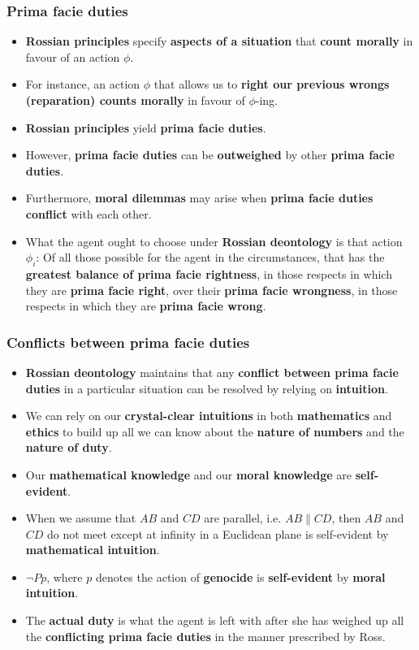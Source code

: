 \documentclass[11pt]{article}
\begin{document}
\subsubsection{Prima facie duties}
\label{sec:org7e4c5fe}
\begin{itemize}
\item \textbf{Rossian principles} specify \textbf{aspects of a situation} that \textbf{count morally} in favour of an action \(\phi\).
\item For instance, an action \(\phi\) that allows us to \textbf{right our previous wrongs (reparation) counts morally} in favour of \(\phi\)-ing.
\item \textbf{Rossian principles} yield \textbf{prima facie duties}.
\item However, \textbf{prima facie duties} can be \textbf{outweighed} by other \textbf{prima facie duties}.
\item Furthermore, \textbf{moral dilemmas} may arise when \textbf{prima facie duties conflict} with each other.
\item What the agent ought to choose under \textbf{Rossian deontology} is that action \(\phi_i\):
Of all those possible for the agent in the circumstances, that has the \textbf{greatest balance of prima facie rightness}, in those respects in which they are \textbf{prima facie right}, over their \textbf{prima facie wrongness}, in those respects in which they are \textbf{prima facie wrong}.
\end{itemize}
\subsubsection{Conflicts between prima facie duties}
\label{sec:orga7a9f00}
\begin{itemize}
\item \textbf{Rossian deontology} maintains that any \textbf{conflict between prima facie duties} in a particular situation can be resolved by relying on \textbf{intuition}.
\item We can rely on our \textbf{crystal-clear intuitions} in both \textbf{mathematics} and \textbf{ethics} to build up all we can know about the \textbf{nature of numbers} and the \textbf{nature of duty}.
\item Our \textbf{mathematical knowledge} and our \textbf{moral knowledge} are \textbf{self-evident}.
\item When we assume that \(AB\) and \(CD\) are parallel, i.e. \(AB \parallel CD\), then \(AB\) and \(CD\) do not meet except at infinity in a Euclidean plane is self-evident by \textbf{mathematical intuition}.
\item \(\neg Pp\), where \(p\) denotes the action of \textbf{genocide} is \textbf{self-evident} by \textbf{moral intuition}.
\item The \textbf{actual duty} is what the agent is left with after she has weighed up all the \textbf{conflicting prima facie duties} in the manner prescribed by Ross.
\end{itemize}
\end{document}
